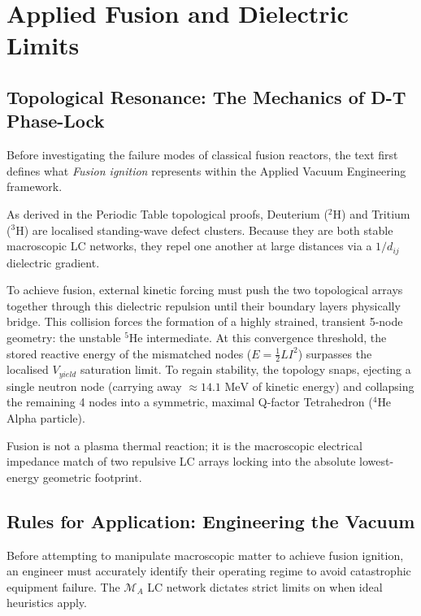 \chapter{Applied Fusion and Dielectric Limits}
\label{ch:applied_fusion}

\section{Topological Resonance: The Mechanics of D-T Phase-Lock}

Before investigating the failure modes of classical fusion reactors, the text first defines what \textit{Fusion ignition} represents within the Applied Vacuum Engineering framework. 

As derived in the Periodic Table topological proofs, Deuterium ($^2$H) and Tritium ($^3$H) are localised standing-wave defect clusters. Because they are both stable macroscopic LC networks, they repel one another at large distances via a $1/d_{ij}$ dielectric gradient.

To achieve fusion, external kinetic forcing must push the two topological arrays together through this dielectric repulsion until their boundary layers physically bridge. This collision forces the formation of a highly strained, transient 5-node geometry: the unstable $^5$He intermediate.
At this convergence threshold, the stored reactive energy of the mismatched nodes ($E = \frac{1}{2}LI^2$) surpasses the localised $V_{yield}$ saturation limit. To regain stability, the topology snaps, ejecting a single neutron node (carrying away $\approx 14.1\text{ MeV}$ of kinetic energy) and collapsing the remaining 4 nodes into a symmetric, maximal Q-factor Tetrahedron ($^4$He Alpha particle).

Fusion is not a plasma thermal reaction; it is the macroscopic electrical impedance match of two repulsive LC arrays locking into the absolute lowest-energy geometric footprint.

\section{Rules for Application: Engineering the Vacuum}

Before attempting to manipulate macroscopic matter to achieve fusion ignition, an engineer must accurately identify their operating regime to avoid catastrophic equipment failure. The $\mathcal{M}_A$ LC network dictates strict limits on when ideal heuristics apply.

